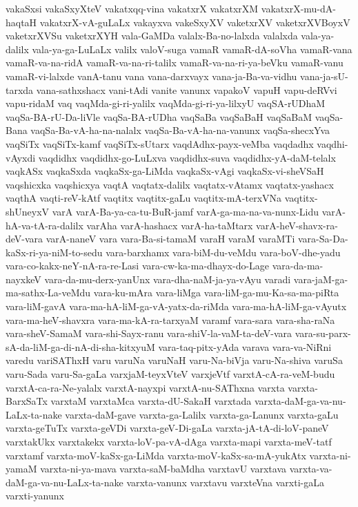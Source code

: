 {vakaSxsi
vakaSxyXteV
vakatxqq-vina
vakatxrX
vakatxrXM
vakatxrX-mu-dA-haqtaH
vakatxrX-vA-guLaLx
vakayxva
vakeSxyXV
vaketxrXV
vaketxrXVBoyxV
vaketxrXVSu
vaketxrXYH
vala-GaMDa
valalx-Ba-no-lalxda
valalxda
vala-ya-dalilx
vala-ya-ga-LuLaLx
valilx
valoV-suga
vamaR
vamaR-dA-soVha
vamaR-vana
vamaR-va-na-ridA
vamaR-va-na-ri-talilx
vamaR-va-na-ri-ya-beVku
vamaR-vanu
vamaR-vi-lalxde
vanA-tanu
vana
vana-darxvayx
vana-ja-Ba-va-vidhu
vana-ja-sU-tarxda
vana-sathxshacx
vani-tAdi
vanite
vanunx
vapakoV
vapuH
vapu-deRVvi
vapu-ridaM
vaq
vaqMda-gi-ri-yalilx
vaqMda-gi-ri-ya-lilxyU
vaqSA-rUDhaM
vaqSa-BA-rU-Da-liVle
vaqSa-BA-rUDha
vaqSaBa
vaqSaBaH
vaqSaBaM
vaqSa-Bana
vaqSa-Ba-vA-ha-na-nalalx
vaqSa-Ba-vA-ha-na-vanunx
vaqSa-shecxYva
vaqSiTx
vaqSiTx-kamf
vaqSiTx-sUtarx
vaqdAdhx-payx-veMba
vaqdadhx
vaqdhi-vAyxdi
vaqdidhx
vaqdidhx-go-LuLxva
vaqdidhx-suva
vaqdidhx-yA-daM-telalx
vaqkASx
vaqkaSxda
vaqkaSx-ga-LiMda
vaqkaSx-vAgi
vaqkaSx-vi-sheVSaH
vaqshicxka
vaqshicxya
vaqtA
vaqtatx-dalilx
vaqtatx-vAtamx
vaqtatx-yashacx
vaqthA
vaqti-reV-kAtf
vaqtitx
vaqtitx-gaLu
vaqtitx-mA-terxVNa
vaqtitx-shUneyxV
varA
varA-Ba-ya-ca-tu-BuR-jamf
varA-ga-ma-na-va-nunx-Lidu
varA-hA-va-tA-ra-dalilx
varAha
varA-hashacx
varA-ha-taMtarx
varA-heV-shavx-ra-deV-vara
varA-naneV
vara
vara-Ba-si-tamaM
varaH
varaM
varaMTi
vara-Sa-Da-kaSx-ri-ya-niM-to-sedu
vara-barxhamx
vara-biM-du-veMdu
vara-boV-dhe-yadu
vara-co-kakx-neY-nA-ra-re-Lasi
vara-cw-ka-ma-dhayx-do-Lage
vara-da-ma-nayxkeV
vara-da-mu-derx-yanUnx
vara-dha-naM-ja-ya-vAyu
varadi
vara-jaM-ga-ma-sathx-La-veMdu
vara-ku-mAra
vara-liMga
vara-liM-ga-mu-Ka-sa-ma-piRta
vara-liM-gavA
vara-ma-hA-liM-ga-vA-yatx-da-riMda
vara-ma-hA-liM-ga-vAyutx
vara-ma-heV-shavxra
vara-ma-kA-ra-tarxyaM
varamf
vara-sara
vara-sha-raNa
vara-sheV-SamaM
vara-shi-Sayx-ranu
vara-shiV-la-vaM-ta-deV-vara
vara-su-parx-sA-da-liM-ga-di-nA-di-sha-kitxyuM
vara-taq-pitx-yAda
varava
vara-va-NiRni
varedu
variSAThxH
varu
varuNa
varuNaH
varu-Na-biVja
varu-Na-shiva
varuSa
varu-Sada
varu-Sa-gaLa
varxjaM-teyxVteV
varxjeVtf
varxtA-cA-ra-veM-budu
varxtA-ca-ra-Ne-yalalx
varxtA-nayxpi
varxtA-nu-SAThxna
varxta
varxta-BarxSaTx
varxtaM
varxtaMca
varxta-dU-SakaH
varxtada
varxta-daM-ga-va-nu-LaLx-ta-nake
varxta-daM-gave
varxta-ga-Lalilx
varxta-ga-Lanunx
varxta-gaLu
varxta-geTuTx
varxta-geVDi
varxta-geV-Di-gaLa
varxta-jA-tA-di-loV-paneV
varxtakUkx
varxtakekx
varxta-loV-pa-vA-dAga
varxta-mapi
varxta-meV-tatf
varxtamf
varxta-moV-kaSx-ga-LiMda
varxta-moV-kaSx-sa-mA-yukAtx
varxta-ni-yamaM
varxta-ni-ya-mava
varxta-saM-baMdha
varxtavU
varxtava
varxta-va-daM-ga-va-nu-LaLx-ta-nake
varxta-vanunx
varxtavu
varxteVna
varxti-gaLa
varxti-yanunx
}
